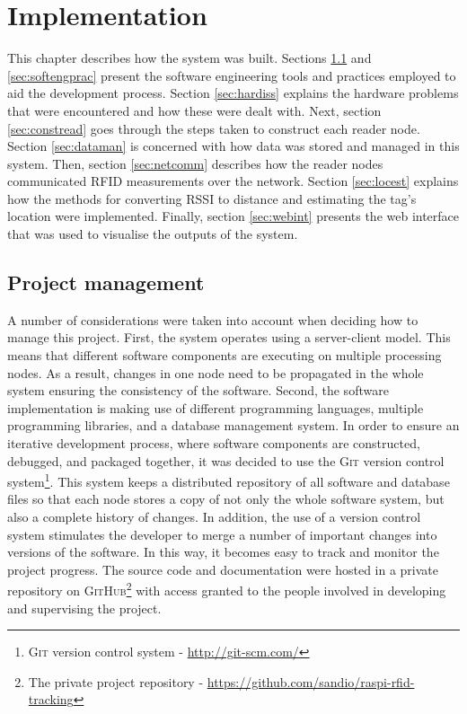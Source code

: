 \chapter{Implementation}
\label{ch:implementation}

This chapter describes how the system was built. Sections \ref{sec:projman} and \ref{sec:softengprac} present the software engineering tools and practices employed to aid the development process. Section \ref{sec:hardiss} explains the hardware problems that were encountered and how these were dealt with. Next, section \ref{sec:constread} goes through the steps taken to construct each reader node. Section \ref{sec:dataman} is concerned with how data was stored and managed in this system. Then, section \ref{sec:netcomm} describes how the reader nodes communicated RFID measurements over the network. Section \ref{sec:locest} explains how the methods for converting RSSI to distance and estimating the tag's location were implemented. Finally, section \ref{sec:webint} presents the web interface that was used to visualise the outputs of the system.

\section{Project management}
\label{sec:projman}

A number of considerations were taken into account when deciding how to manage this project. First, the system operates using a server-client model. This means that different software components are executing on multiple processing nodes. As a result, changes in one node need to be propagated in the whole system ensuring the consistency of the software.  Second, the software implementation is making use of different programming languages, multiple programming libraries, and a database management system. In order to ensure an iterative development process, where software components are constructed, debugged, and packaged together, it was decided to use the \textsc{Git} version control system\footnote{\textsc{Git} version control system - \url{http://git-scm.com/}}. This system keeps a distributed repository of all software and database files so that each node stores a copy of not only the whole software system, but also a complete history of changes. In addition, the use of a version control system stimulates the developer to merge a number of important changes into versions of the software. In this way, it becomes easy to track and monitor the project progress. The source code and documentation were hosted in a private repository on \textsc{GitHub}\footnote{The private project repository - \url{https://github.com/sandio/raspi-rfid-tracking}} with access granted to the people involved in developing and supervising the project.


